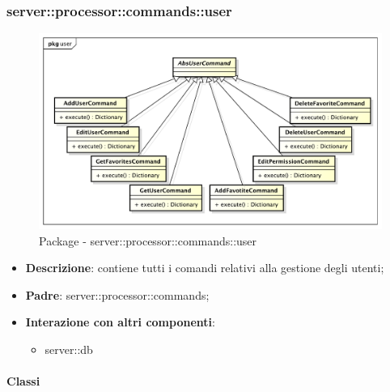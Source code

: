       \subsubsection{server::processor::commands::user} %
      \label{ssub:bdsm_app_server_processor_commands_user}
      \begin{figure}[!htbp]
      	\centering
      	\centerline{\includegraphics[scale=0.5]{./images/server/user.pdf}}
      	\caption{Package - server::processor::commands::user}
      \end{figure}

      \begin{itemize}
        \item \textbf{Descrizione}: contiene tutti i comandi relativi alla gestione degli utenti;
        \item \textbf{Padre}: server::processor::commands;
        \item \textbf{Interazione con altri componenti}:
          \begin{itemize}
            \item server::db
          \end{itemize}
      \end{itemize}

        \paragraph{Classi} %


